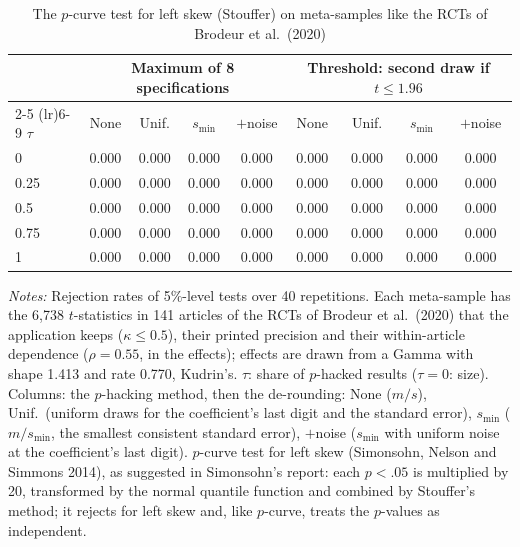 \begin{table}[htbp]
\centering
\caption{The $p$-curve test for left skew (Stouffer) on meta-samples like the RCTs of Brodeur et al.\ (2020)}
\label{tab:brodeur_rct_power_stouffer}
\footnotesize
\setlength{\tabcolsep}{4pt}
\begin{tabular}{lcccccccc}
\toprule
 & \multicolumn{4}{c}{Maximum of 8 specifications} & \multicolumn{4}{c}{Threshold: second draw if $t \le 1.96$} \\
\cmidrule(lr){2-5} \cmidrule(lr){6-9}
$\tau$ & None & Unif. & $s_{\min}$ & $+$noise & None & Unif. & $s_{\min}$ & $+$noise \\
\midrule
0 & 0.000 & 0.000 & 0.000 & 0.000 & 0.000 & 0.000 & 0.000 & 0.000 \\
0.25 & 0.000 & 0.000 & 0.000 & 0.000 & 0.000 & 0.000 & 0.000 & 0.000 \\
0.5 & 0.000 & 0.000 & 0.000 & 0.000 & 0.000 & 0.000 & 0.000 & 0.000 \\
0.75 & 0.000 & 0.000 & 0.000 & 0.000 & 0.000 & 0.000 & 0.000 & 0.000 \\
1 & 0.000 & 0.000 & 0.000 & 0.000 & 0.000 & 0.000 & 0.000 & 0.000 \\
\bottomrule
\end{tabular}
\par\smallskip
\begin{minipage}{\linewidth}\footnotesize\textit{Notes:} Rejection rates of 5\%-level tests over 40 repetitions. Each meta-sample has the 6{,}738 $t$-statistics in 141 articles of the RCTs of Brodeur et al.\ (2020) that the application keeps ($\kappa \le 0.5$), their printed precision and their within-article dependence ($\rho = 0.55$, in the effects); effects are drawn from a Gamma with shape 1.413 and rate 0.770, Kudrin's. $\tau$: share of $p$-hacked results ($\tau = 0$: size). Columns: the $p$-hacking method, then the de-rounding: None ($m/s$), Unif.\ (uniform draws for the coefficient's last digit and the standard error), $s_{\min}$ ($m/s_{\min}$, the smallest consistent standard error), $+$noise ($s_{\min}$ with uniform noise at the coefficient's last digit). $p$-curve test for left skew (Simonsohn, Nelson and Simmons 2014), as suggested in Simonsohn's report: each $p < .05$ is multiplied by 20, transformed by the normal quantile function and combined by Stouffer's method; it rejects for left skew and, like $p$-curve, treats the $p$-values as independent.\end{minipage}
\end{table}
